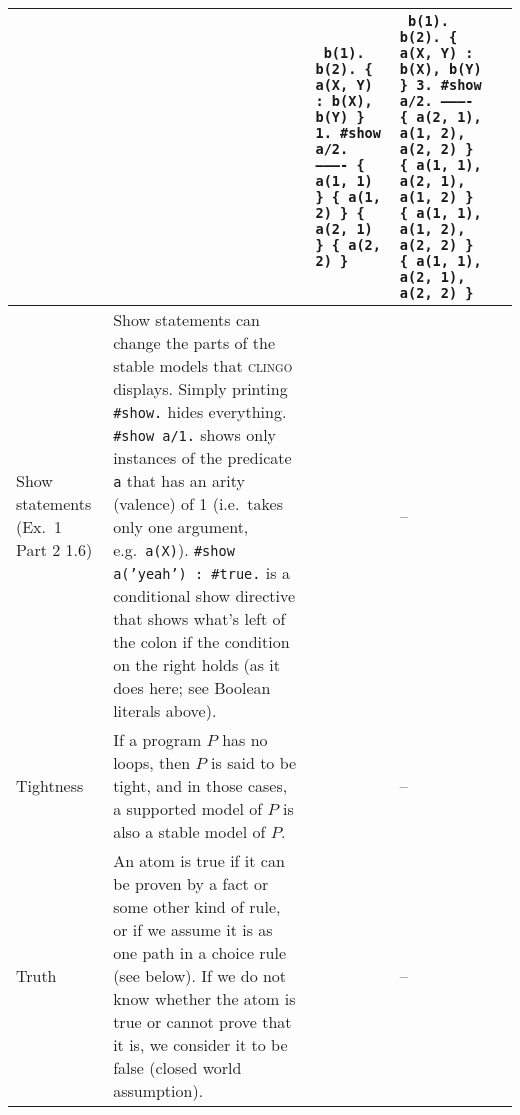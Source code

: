 \documentclass[9pt,a4paper,landscape]{article}
\begin{document}
{\begin{longtable}{Lp{14.5cm}lXX}
&& {\scriptsize\texttt{%
		b(1). b(2).  \{ a(X, Y) : b(X), b(Y) \} 1.\newline
		\#show a/2.\newline
		---------- \newline
		\{ a(1, 1) \} \newline
		\{ a(1, 2) \} \newline
		\{ a(2, 1) \} \newline
		\{ a(2, 2) \} \newline
}} &
{\scriptsize\texttt{%
		b(1). b(2).  \{ a(X, Y) : b(X), b(Y) \} 3.\newline
		\#show a/2.\newline
		---------- \newline
		\{ a(2, 1), a(1, 2), a(2, 2) \} \newline
		\{ a(1, 1), a(2, 1), a(1, 2) \} \newline
		\{ a(1, 1), a(1, 2), a(2, 2) \} \newline
		\{ a(1, 1), a(2, 1), a(2, 2) \} \newline
}}
\\ 

\midrule

Show statements \newline (Ex.\ 1 Part 2 1.6)
& Show statements can change the parts of the stable models that \textsc{clingo} displays.
Simply printing \texttt{\#show.} hides everything.
\texttt{\#show a/1.} shows only instances of the predicate \texttt{a} that has an arity (valence) of 1 (i.e.\ takes only one argument, e.g.\ \texttt{a(X)}).
\texttt{\#show a('yeah') : \#true.} is a conditional show directive that shows what's left of the colon if the condition on the right holds (as it does here; see Boolean literals above). 	
&& -- &\\ \midrule

Tightness
& If a program $P$ has no loops, then $P$ is said to be tight, and in those cases, a supported model of $P$ is also a stable model of $P$.
&& -- &\\ \midrule

Truth
& An atom is true if it can be proven by a fact or some other kind of rule, or if we assume it is as one path in a choice rule (see below).
If we do not know whether the atom is true or cannot prove that it is, we consider it to be false (closed world assumption). 
&& -- &\\ \midrule


\end{longtable}}
\end{document}
